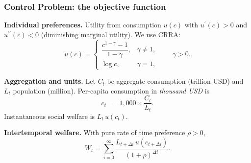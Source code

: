 \documentclass[xcolor=x11names,compress,aspectratio=169]{beamer}%
\makeatletter
\renewenvironment{itemize}{\begin{compactitemize}[<+-| alert@+>]}{\end{compactitemize}}
\makeatother
\begin{document}
\begin{frame}%
%

\frametitle{Control Problem: the objective function}%


\begin{itemize}
\item \textbf{Individual preferences.} Utility from consumption $u(c)$ with
$u^{\prime}(c)>0$ and $u^{\prime\prime}(c)<0$ (diminishing marginal utility).
We use CRRA:%
\[
u(c)=%
\begin{cases}
\dfrac{c^{1-\gamma}-1}{1-\gamma}, & \gamma\neq1,\\[0.6em]%
\log c, & \gamma=1,
\end{cases}
\qquad\gamma>0.
\]


\item \textbf{Aggregation and units.} Let $C_{t}$ be aggregate consumption
(trillion USD) and $L_{t}$ population (million). Per-capita consumption in
\emph{thousand USD} is
\[
c_{t}\;=\;1,000\times\frac{C_{t}}{L_{t}}.
\]
Instantaneous social welfare is $L_{t}\,u(c_{t})$.

\item \textbf{Intertemporal welfare.} With pure rate of time preference
$\rho>0$,%
\[
W_{t}=\sum_{i=0}^{\infty}\frac{L_{t+\Delta i}\,u(c_{t+\Delta i})}%
{(1+\rho)^{\Delta i}}.
\]

\end{itemize}

%

\transboxout
\end{frame}%
%
\end{document}
